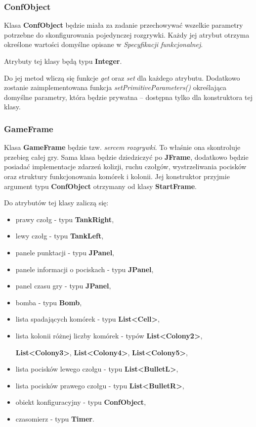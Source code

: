 \documentclass[a4paper]{article}
\begin{document}
\subsubsection{ConfObject}

\quad Klasa \textbf{ConfObject} b\k{e}dzie mia\l{}a za zadanie przechowywa\'c wszelkie parametry potrzebne do skonfigurowania pojedynczej rozgrywki. Ka\.zdy jej atrybut otrzyma okre\'slone warto\'sci domy\'slne opisane w \textit{Specyfikacji funkcjonalnej}.

Atrybuty tej klasy b\k{e}d\k{a} typu \textbf{Integer}. 

Do jej metod wlicz\k{a} si\k{e} funkcje \textit{get} oraz \textit{set} dla ka\.zdego atrybutu. Dodatkowo zostanie zaimplementowana funkcja \textit{setPrimitiveParameters()} okre\'slaj\k{a}ca domy\'slne parametry, kt\'ora b\k{e}dzie prywatna – dost\k{e}pna tylko dla konstruktora tej klasy.

\subsubsection{GameFrame}

\quad Klasa \textbf{GameFrame} b\k{e}dzie tzw. \textit{sercem rozgrywki}. To w\l{}a\'snie ona skontroluje przebieg ca\l{}ej gry. Sama klasa b\k{e}dzie dziedziczy\'c po \textbf{JFrame}, dodatkowo b\k{e}dzie posiada\'c implementacje zdarze\'n kolizji, ruchu czo\l{}g\'ow, wystrzeliwania pocisk\'ow oraz struktury funkcjonowania kom\'orek i kolonii. Jej  konstruktor przyjmie argument typu \textbf{ConfObject} otrzymany od klasy \textbf{StartFrame}.

Do atrybut\'ow tej klasy zalicz\k{a} si\k{e}:
\begin{itemize}
    \item prawy czo\l{}g - typu \textbf{TankRight},
    \item lewy czo\l{}g - typu \textbf{TankLeft},
    \item panele punktacji - typu \textbf{JPanel},
    \item panele informacji o pociskach - typu \textbf{JPanel},
    \item panel czasu gry - typu \textbf{JPanel},
    \item bomba - typu \textbf{Bomb},
    \item lista spadaj\k{a}cych kom\'orek - typu \textbf{List<Cell>},
    \item lista kolonii r\'o\.znej liczby kom\'orek - typ\'ow \textbf{List<Colony2>}, 
    
    \textbf{List<Colony3>}, \textbf{List<Colony4>}, \textbf{List<Colony5>},
    \item lista pocisk\'ow lewego czo\l{}gu - typu \textbf{List<BulletL>},
    \item lista pocisk\'ow prawego czo\l{}gu - typu \textbf{List<BulletR>},
    \item obiekt konfiguracyjny - typu \textbf{ConfObject},
    \item czasomierz - typu \textbf{Timer}.
\end{itemize}
\end{document}
